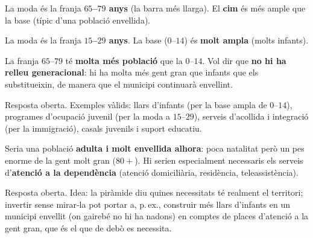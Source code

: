 \begin{solucions}
\begin{sollist}
  \item La moda és la franja \textbf{$65$–$79$ anys} (la barra més llarga). El
        \textbf{cim} és més ample que la base (típic d'una població envellida).
  \item La moda és la franja \textbf{$15$–$29$ anys}. La base ($0$–$14$) és
        \textbf{molt ampla} (molts infants).
  \item La franja $65$–$79$ té \textbf{molta més població} que la $0$–$14$. Vol dir que
        \textbf{no hi ha relleu generacional}: hi ha molta més gent gran que infants
        que els substitueixin, de manera que el municipi continuarà envellint.
  \item Resposta oberta. Exemples vàlids: llars d'infants (per la base ampla de
        $0$–$14$), programes d'ocupació juvenil (per la moda a $15$–$29$), serveis
        d'acollida i integració (per la immigració), casals juvenils i suport educatiu.
  \item Seria una població \textbf{adulta i molt envellida alhora}: poca natalitat però
        un pes enorme de la gent molt gran ($80+$). Hi serien especialment necessaris
        els serveis d'\textbf{atenció a la dependència} (atenció domiciliària,
        residència, teleassistència).
  \item Resposta oberta. Idea: la piràmide diu quines necessitats té realment el
        territori; invertir sense mirar-la pot portar a, p.\,ex., construir més llars
        d'infants en un municipi envellit (on gairebé no hi ha nadons) en comptes de
        places d'atenció a la gent gran, que és el que de debò es necessita.
\end{sollist}
\end{solucions}
